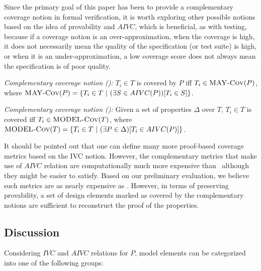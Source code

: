 Since the primary goal of
 this paper has been to provide a complementary coverage notion in
  formal verification, it is worth exploring other possible notions based on the idea of provability and $AIVC$, which is beneficial, as with testing, because if a coverage notion is an over-approximation, when the coverage
 is high, it does not necessarily mean the quality of
 the specification (or test suite) is high, or when it is an under-approximation, a low coverage score does not always mean the specification is of poor quality.

\begin{definition} {\emph{Complementary coverage notion (\maycov):}}
  \label{def:comp-1} 
 $T_i \in T$ is covered by $P$ iff $T_i \in \text{\sc MAY-Cov} (P)$, where
   $\text{\sc MAY-Cov} (P) = \{T_i \in T ~|~ (\exists S \in AIVC(P))[T_i \in S] \}$.
\end{definition}

\begin{definition} {\emph{Complementary coverage notion (\allcov):}}
  \label{def:comp-2} 
     Given a set of properties $\Delta$ over $T$, $T_i \in T$ is covered
   iff $T_i \in \text{\sc MODEL-Cov} (T)$, where
   $\text{\sc MODEL-Cov} (T) = \{T_i \in T ~|~ (\exists P \in \Delta)[T_i \in AIVC(P)] \}$.
\end{definition}

It should be pointed out that one can define many more proof-based coverage metrics based on the IVC notion. However, the complementary metrics that make use of $AIVC$ relation are computationally much more expensive than \ivccov\ although they might be easier to satisfy. Based on our preliminary evaluation, we believe such metrics are as nearly expensive as \nondetcov. However, in terms of preserving provability, a set of design elements marked as covered by the complementary notions are
sufficient to reconstruct the proof of the properties.


\subsection{Discussion}
\label{subsec:method-disc}

Considering $IVC$ and $AIVC$ relations for $P$, model elements can be categorized into one of the following groups:

